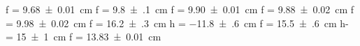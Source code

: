 f = \SI{+9.68(1)}{\centi\meter}
f = \SI{+9.8(1)}{\centi\meter}
f = \SI{+9.90(1)}{\centi\meter}
f = \SI{+9.88(2)}{\centi\meter}
f = \SI{+9.98(2)}{\centi\meter}
f = \SI{+16.2(3)}{\centi\meter}
h = \SI{-11.8(6)}{\centi\meter}
f = \SI{+15.5(6)}{\centi\meter}
h- = \SI{+15(1)}{\centi\meter}
f = \SI{+13.83(1)}{\centi\meter}

